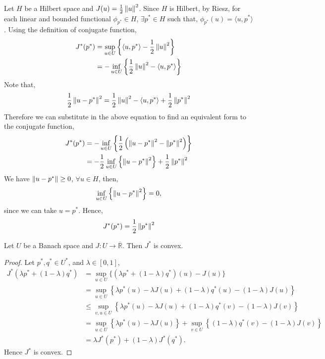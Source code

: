 \begin{example}
	Let $H$ be a Hilbert space and $J(u)=\frac{1}{2} \left\lVert u\right\rVert^2$.
	Since $H$ is Hilbert, by Riesz, for each linear and bounded functional $\phi_{p^{*}} \in H$, $\exists p^* \in H$ such that, $\phi_{p^{*}}(u)=\langle u,p^*\rangle$. Using the definition of conjugate function,
	\begin{align*}
	J^*(p^*) &= \sup_{u \in U} \left\lbrace\langle u, p^*\rangle -\frac{1}{2} \left\lVert u\right\rVert^2\right\rbrace \\
	&= -\inf_{u \in U} \left\lbrace \frac{1}{2} \left\lVert u\right\rVert^2-\langle u, p^*\rangle \right\rbrace
	\end{align*}
Note that,
\[
	\frac{1}{2}\left\lVert u-p^*\right\rVert^2=\frac{1}{2}\left\lVert u\right\rVert^2-\langle u ,p^*\rangle + \frac{1}{2}\left\lVert p^*\right\rVert^2 
\]
Therefore we can substitute in the above equation to find an equivalent form to the conjugate function,
\begin{align*}
J^*(p^*) &=-\inf_{u \in U} \left\lbrace \frac{1}{2} \left(\left\lVert u-p^*\right\rVert^2 - \left\lVert p^*\right\rVert^2\right) \right\rbrace \\
&=-\frac{1}{2} \inf_{u \in U} \left\lbrace  \left\lVert u-p^*\right\rVert^2\right\rbrace +\frac{1}{2} \left\lVert p^*\right\rVert^2
\end{align*}
We have $\left\lVert u-p^*\right\rVert \geq 0$, $\forall u \in H$, then,
\[
\inf_{u \in U} \left\lbrace  \left\lVert u-p^*\right\rVert^2\right\rbrace=0,
\]
since we can take $u=p^*$. Hence,
\begin{equation}
	J^*(p^*)=\frac{1}{2}\left\lVert p^*\right\rVert^2
\end{equation}
\end{example}
\begin{theorem}
	Let $U$ be a Banach space and $J:U\rightarrow \overline{\mathbb{R}}$. Then $J^*$ is convex.
	\begin{proof}
		Let $p^*, q^* \in U^*$, and $\lambda \in [0,1]$,
		\begin{align*}
			J^*(\lambda p^* +(1-\lambda)q^*) &=\sup_{u\in U}\lbrace (\lambda p^* +(1-\lambda)q^*)(u)-J(u) \rbrace \\
										 &= \sup_{u \in U} \left\lbrace  \lambda p^*(u)	- \lambda J(u) +(1-\lambda)q^* (u)-(1-\lambda)J(u)\right\rbrace\\
										 &\leq \sup_{v,u\in U} \left\lbrace  \lambda p^*(u)	- \lambda J(u) +(1-\lambda)q^* (v)-(1-\lambda)J(v)\right\rbrace \\
										 &=\sup_{u\in U} \left\lbrace  \lambda p^*(u)	- \lambda J(u)\right\rbrace +\sup_{v \in U}\left\lbrace(1-\lambda)q^* (v)-(1-\lambda)J(v)\right\rbrace \\
										 &=\lambda J^*(p^*)+(1-\lambda) J^*(q^*).
		\end{align*}	
		Hence $J^*$ is convex.
	\end{proof}
\end{theorem}
